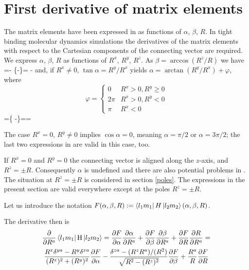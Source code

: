 \section[First derivative]{First derivative of matrix elements}
\label{Fder}
%
\par{The matrix elements have been expressed in 
as functions of $\alpha$, $\beta$, $R$.
In tight binding molecular dynamics simulations the derivatives of the matrix elements with
respect to the Cartesian components of the connecting vector are required. We express
$\alpha$, $\beta$, $R$ as functions of $R^x$, $R^y$, $R^z$. As
$\beta=\arccos (R^{z}/{R})$ we have}
\be
\label{Fderbeta}
=-\cdot
\biggl\{-\biggr\}=
-
\ee
and, if $R^x\neq0$, $\tan\alpha=R^{y}/R^{x}$ yields
$\alpha=\arctan (R^{y}/R^{x})+\varphi$, where
\begin{equation*}
\varphi=\left\{\begin{array}{ll}
0& {R^x>0,R^y\geq 0}\\
{2\pi}&{R^x>0,R^y<0}\\
{\pi}&{R^x<0}
\end{array}\right.\end{equation*}
\be
\label{Fderalpha}
=\cdot\biggl\{
-\biggr\}==
\ee
\par{The case $R^x=0$, $R^y\neq0$ implies $\cos\alpha=0$, meaning  $\alpha=\pi/2$
or $\alpha=3\pi/2$; the last two expressions in 
are valid in this case, too.}
\par{If $R^x=0$ and $R^y=0$ the connecting vector is aligned along the $z$-axis, and $R^z=\pm R$.
Consequently $\alpha$ is undefined and there are also potential problems in .
The situation at $R^z=\pm R$ is considered in section \ref{poles}.
The expressions in the present section are valid everywhere except at the poles $R^z=\pm R$.}
\par{Let us introduce the notation }
$F(\alpha,\beta,R):=\mathinner{\langle{l_1m_1}|}H\mathinner{|{l_2m_2}\rangle}(\alpha,\beta,R)$.
\par{The derivative then is}
\begin{multline}
\frac{\partial }{\partial R^a}\mathinner{\langle{l_1m_1}|}\text{H}\mathinner{|{l_2m_2}\rangle}=\frac{\partial F}{\partial \alpha}\frac{\partial \alpha}{\partial R^a}
+\frac{\partial F}{\partial \beta}\frac{\partial \beta}{\partial R^a}+\frac{\partial F}{\partial R}\frac{\partial R}{\partial R^a}=\\
\frac{R^x\delta^{ya}-R^y\delta^{xa}}{(R^x)^2+(R^y)^2}
\frac{\partial F}{\partial \alpha}-\frac{\delta^{za}-(R^{z}R^{a})/(R^2)}{\sqrt{R^2-(R^z)^2}}\frac{\partial F}{\partial \beta}+\frac{R^a}{R}\frac{\partial F}{\partial R}
\end{multline}
